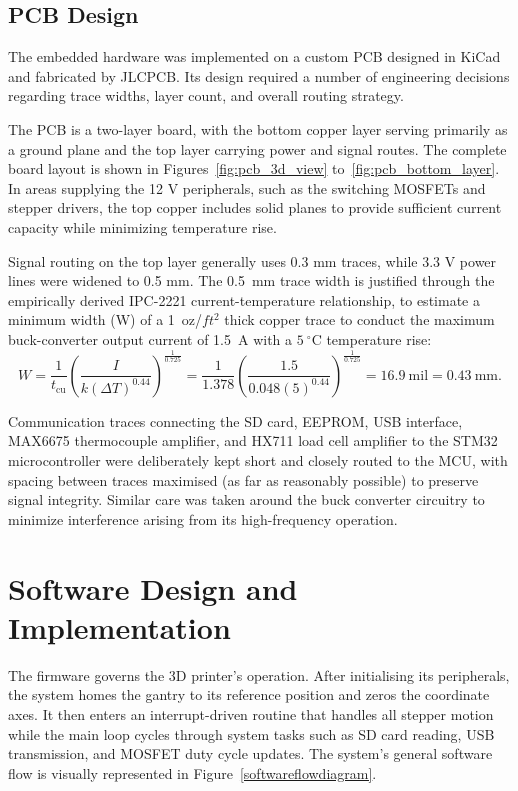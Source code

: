 \subsection{PCB Design}
The embedded hardware was implemented on a custom PCB designed in KiCad and fabricated by JLCPCB. Its design required a number of engineering decisions regarding trace widths, layer count, and overall routing strategy.

The PCB is a two-layer board, with the bottom copper layer serving primarily as a ground plane and the top layer carrying power and signal routes. The complete board layout is shown in Figures~\ref{fig:pcb_3d_view} to~\ref{fig:pcb_bottom_layer}. In areas supplying the 12 V peripherals, such as the switching MOSFETs and stepper drivers, the top copper includes solid planes to provide sufficient current capacity while minimizing temperature rise.

Signal routing on the top layer generally uses 0.3 mm traces, while 3.3 V power lines were widened to 0.5 mm. The 0.5~mm trace width is justified through the empirically derived IPC-2221 current-temperature relationship, to estimate a minimum width (W) of a 1~oz/$ft^2$ thick copper trace to conduct the maximum buck-converter output current of 1.5~A with a $5~^\circ$C temperature rise:
\[
W = \frac{1}{t_{\text{cu}}}\left(\frac{I}{k(\Delta T)^{0.44}}\right)^{\frac{1}{0.725}} = \frac{1}{1.378}\left(\frac{1.5}{0.048(5)^{0.44}}\right)^{\frac{1}{0.725}} = 16.9~\text{mil} = 0.43~\text{mm}.
\]


Communication traces connecting the SD card, EEPROM, USB interface, MAX6675 thermocouple amplifier, and HX711 load cell amplifier to the STM32 microcontroller were deliberately kept short and closely routed to the MCU, with spacing between traces maximised (as far as reasonably possible) to preserve signal integrity. Similar care was taken around the buck converter circuitry to minimize interference arising from its high-frequency operation.

\section{Software Design and Implementation}
The firmware governs the 3D printer's operation. After initialising its peripherals, the system homes the gantry to its reference position and zeros the coordinate axes. It then enters an interrupt-driven routine that handles all stepper motion while the main loop cycles through system tasks such as SD card reading, USB transmission, and MOSFET duty cycle updates. The system's general software flow is visually represented in Figure~\ref{softwareflowdiagram}.

